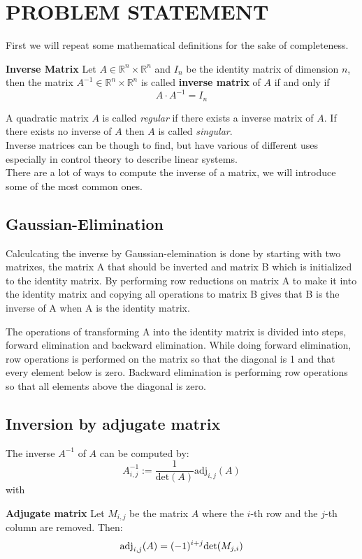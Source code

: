 

\section{PROBLEM STATEMENT}\label{sec:problem}
First we will repeat some mathematical definitions for the sake of completeness.
\begin{definition}
	\textbf{Inverse Matrix}
	Let $A \in \mathbb{R}^n \times \mathbb{R}^n$ and $I_n$ be the identity matrix of dimension $n$, then the matrix $A^{-1} \in \mathbb{R}^n \times \mathbb{R}^n$ is called \textbf{inverse matrix} of $A$ if and only if
	\begin{equation}\label{eq:inverse}
	A \cdot A^{-1} = I_n
	\end{equation}
\end{definition}
A quadratic matrix $A$ is called \emph{regular} if there exists a inverse matrix of $A$. If there exists no inverse of $A$ then $A$ is called \emph{singular}.\\
Inverse matrices can be though to find, but have various of different uses especially in control theory to describe linear systems.  
\vspace{0.2cm}\\
There are a lot of ways to compute the inverse of a matrix, we will introduce some of the most common ones.\\
\subsection*{Gaussian-Elimination}
Calculcating the inverse by Gaussian-elemination is done by starting with two matrixes, the matrix A that should be inverted and matrix B which is initialized to the identity matrix. By performing row reductions on matrix A to make it into the identity matrix and copying all operations to matrix B gives that B is the inverse of A when A is the identity matrix.

The operations of transforming A into the identity matrix is divided into steps, forward elimination and backward elimination.
While doing forward elimination, row operations is performed on the matrix so that the diagonal is 1 and that every element below is zero.
Backward elimination is performing row operations so that all elements above the diagonal is zero.

\subsection*{Inversion by adjugate matrix}
The inverse $A^{-1}$ of $A$ can be computed by:
\begin{equation}
	A^{-1}_{i,j} := \frac{1}{\text{det}(A)} \text{adj}_{i,j}(A)
\end{equation}
with
\begin{definition}
	\textbf{Adjugate matrix} Let $M_{i,j}$ be the matrix $A$ where the $i$-th row and the $j$-th column are removed. Then:
	\[ \text{\textnormal{adj}}_{i,j}(A) = (-1)^{i+j} \text{\textnormal{det}}(M_{j,i}) \]
\end{definition}

